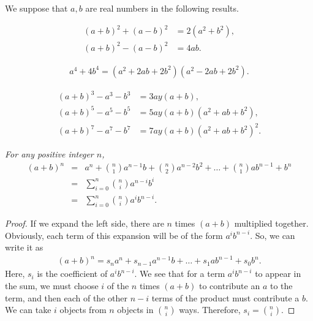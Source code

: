 
	We suppose that $a,b$ are real numbers in the following results\watermark.
	
	\begin{identity}\label{id:diffsqr}
		\begin{align*}
			(a+b)^2+(a-b)^2 &= 2(a^2+b^2),\\
			(a+b)^2-(a-b)^2 & = 4ab.
		\end{align*}
	\end{identity}
	
	\begin{identity}\slshape
		\begin{align*}
			a^4+4b^4=(a^2+2ab+2b^2)(a^2-2ab+2b^2).
		\end{align*}
	\end{identity}
	
	\begin{identity}
		\begin{align*}
			(a+b)^3 - a^3 - b^3 &= 3ay(a+b),\\
			(a+b)^5 - a^5 - b^5 &= 5ay(a+b)(a^2+ab+b^2),\\
			(a+b)^7 - a^7 - b^7 &= 7ay(a+b)(a^2+ab+b^2)^2.
		\end{align*}
	\end{identity}
	
	\begin{theorem}\slshape\label{thm:binomial-theorem}
		For any positive integer $n$,
		\begin{eqnarray*}
			(a+b)^n & = & a^n+\binom{n}{1}a^{n-1}b+\binom{n}{2}a^{n-2}b^2+\dots+\binom{n}{1}ab^{n-1}+b^n\\
			& = & \sum_{i=0}^{n}\binom{n}{i}a^{n-i}b^i\\
			& = & \sum_{i=0}^{n}\binom{n}{i}a^ib^{n-i}.
		\end{eqnarray*}
	\end{theorem}
	
	\begin{proof}
		If we expand the left side, there are $n$ times $(a+b)$ multiplied together. Obviously, each term of this expansion will be of the form $a^ib^{n-i}$. So, we can write it as
		\begin{align*}
			(a+b)^n=s_na^n+s_{n-1}a^{n-1}b+\dots+s_1ab^{n-1}+s_0b^n.
		\end{align*}
		Here, $s_i$ is the coefficient of $a^ib^{n-i}$. We see that for a term $a^ib^{n-i}$ to appear in the sum, we must choose $i$ of the $n$ times $(a+b)$ to contribute an $a$ to the term, and then each of the other $n-i$ terms of the product must contribute a $b$. We can take $i$ objects from $n$ objects in $\binom{n}{i}$ ways. Therefore, $s_i=\binom{n}{i}$.
	\end{proof}
	

